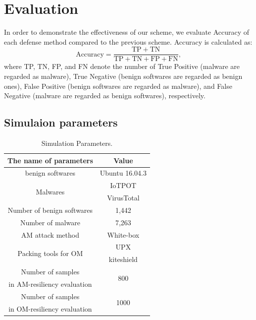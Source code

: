 \documentclass{ieeeaccess}
\begin{document}
\section{Evaluation} \label{sec:evaluation}
In order to demonstrate the effectiveness of our scheme, we evaluate Accuracy of each defense method compared to the previous scheme.
Accuracy is calculated as:
\begin{equation}
  \mathrm{Accuracy} = \frac{\mathrm{TP}+\mathrm{TN}}{\mathrm{TP} + \mathrm{TN} + \mathrm{FP} + \mathrm{FN}}, 
\end{equation}
where TP, TN, FP, and FN denote the number of True Positive (malware are regarded as malware), True Negative (benign softwares are regarded as benign ones), False Positive (benign softwares are regarded as malware), and False Negative (malware are regarded as benign softwares), respectively.  

\subsection{Simulaion parameters}
\begin{table}[h]
	\begin{center}
		\caption{Simulation Parameters.}
		\label{tab:simulation_parameters} 
		\begin{tabular}{|c|c|} \hline
			The name of parameters & Value\\ \hline \hline
			benign softwares & Ubuntu 16.04.3\cite{ubuntu}\\ \hline
			\multirow{2}{*}{\hfill Malwares  \hfill} & IoTPOT\cite{iotpot} \\ 
																							 & VirusTotal\cite{virustotal}\\ \hline
			Number of benign softwares  & 1,442 \\  \hline
			Number of malware  &  7,263 \\ \hline
			AM attack method & White-box \cite{am, yamafumi} \\ \hline
			\multirow{2}{*}{\hfill Packing tools for OM  \hfill} & UPX\cite{upx} \\ & kiteshield\cite{kiteshield} \\ \hline
			Number of samples  & \multirow{2}{*}{\hfill 800 \hfill} \\  
			in AM-resiliency evaluation & \\ \hline 
			Number of samples  & \multirow{2}{*}{\hfill 1000 \hfill} \\  
			in OM-resiliency evaluation & \\ \hline 
		\end{tabular}
	\end{center}
\end{table} 
\end{document}
